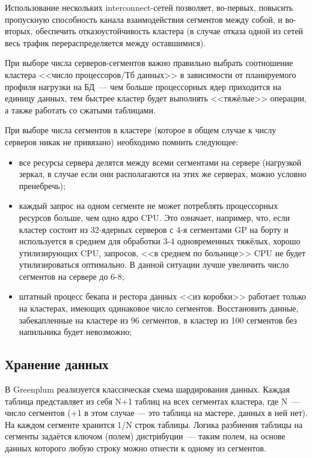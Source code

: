 Использование нескольких interconnect-сетей позволяет, во-первых, повысить пропускную способность канала взаимодействия сегментов между собой, и во-вторых, обеспечить отказоустойчивость кластера (в случае отказа одной из сетей весь трафик перераспределяется между оставшимися).

При выборе числа серверов-сегментов важно правильно выбрать соотношение кластера <<число процессоров/Тб данных>> в зависимости от планируемого профиля нагрузки на БД~--- чем больше процессорных ядер приходится на единицу данных, тем быстрее кластер будет выполнять <<тяжёлые>> операции, а также работать со сжатыми таблицами.

При выборе числа сегментов в кластере (которое в общем случае к числу серверов никак не привязано) необходимо помнить следующее:

\begin{itemize}
  \item все ресурсы сервера делятся между всеми сегментами на сервере (нагрузкой зеркал, в случае если они располагаются на этих же серверах, можно условно пренебречь);
  \item каждый запрос на одном сегменте не может потреблять процессорных ресурсов больше, чем одно ядро CPU. Это означает, например, что, если кластер состоит из 32-ядерных серверов с 4-я сегментами GP на борту и используется в среднем для обработки 3-4 одновременных тяжёлых, хорошо утилизирующих CPU, запросов, <<в среднем по больнице>> CPU не будет утилизироваться оптимально. В данной ситуации лучше увеличить число сегментов на сервере до 6-8;
  \item штатный процесс бекапа и рестора данных <<из коробки>> работает только на кластерах, имеющих одинаковое число сегментов. Восстановить данные, забекапленные на кластере из 96 сегментов, в кластер из 100 сегментов без напильника будет невозможно;
\end{itemize}


\subsection{Хранение данных}
\label{subsec:greenplum_data_storage}

В Greenplum реализуется классическая схема шардирования данных. Каждая таблица представляет из себя N+1 таблиц на всех сегментах кластера, где N~--- число сегментов (+1 в этом случае — это таблица на мастере, данных в ней нет). На каждом сегменте хранится 1/N строк таблицы. Логика разбиения таблицы на сегменты задаётся ключом (полем) дистрибуции~--- таким полем, на основе данных которого любую строку можно отнести к одному из сегментов.


